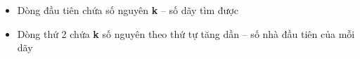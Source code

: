\begin{itemize}
	\item Dòng đầu tiên chứa số nguyên \textbf{k} – số dãy tìm được
	\item Dòng thứ 2 chứa \textbf{k} số nguyên theo thứ tự tăng dần – số nhà đầu tiên của mỗi dãy
\end{itemize}